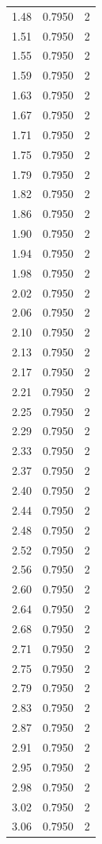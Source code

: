 \begin{longtable}{lrr}
  1.48 & 0.7950 & 2 \\
  1.51 & 0.7950 & 2 \\
  1.55 & 0.7950 & 2 \\
  1.59 & 0.7950 & 2 \\
  1.63 & 0.7950 & 2 \\
  1.67 & 0.7950 & 2 \\
  1.71 & 0.7950 & 2 \\
  1.75 & 0.7950 & 2 \\
  1.79 & 0.7950 & 2 \\
  1.82 & 0.7950 & 2 \\
  1.86 & 0.7950 & 2 \\
  1.90 & 0.7950 & 2 \\
  1.94 & 0.7950 & 2 \\
  1.98 & 0.7950 & 2 \\
  2.02 & 0.7950 & 2 \\
  2.06 & 0.7950 & 2 \\
  2.10 & 0.7950 & 2 \\
  2.13 & 0.7950 & 2 \\
  2.17 & 0.7950 & 2 \\
  2.21 & 0.7950 & 2 \\
  2.25 & 0.7950 & 2 \\
  2.29 & 0.7950 & 2 \\
  2.33 & 0.7950 & 2 \\
  2.37 & 0.7950 & 2 \\
  2.40 & 0.7950 & 2 \\
  2.44 & 0.7950 & 2 \\
  2.48 & 0.7950 & 2 \\
  2.52 & 0.7950 & 2 \\
  2.56 & 0.7950 & 2 \\
  2.60 & 0.7950 & 2 \\
  2.64 & 0.7950 & 2 \\
  2.68 & 0.7950 & 2 \\
  2.71 & 0.7950 & 2 \\
  2.75 & 0.7950 & 2 \\
  2.79 & 0.7950 & 2 \\
  2.83 & 0.7950 & 2 \\
  2.87 & 0.7950 & 2 \\
  2.91 & 0.7950 & 2 \\
  2.95 & 0.7950 & 2 \\
  2.98 & 0.7950 & 2 \\
  3.02 & 0.7950 & 2 \\
  3.06 & 0.7950 & 2 \\

\end{longtable}

